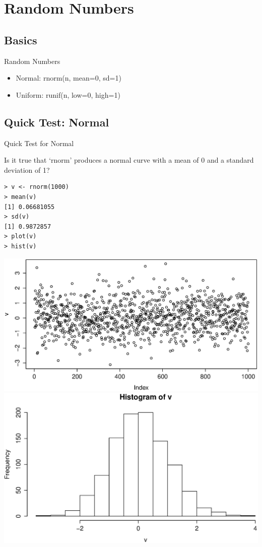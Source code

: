 \documentclass{beamer}
\begin{document}
\section{Random Numbers}

\subsection{Basics}

\begin{frame}[fragile]{Random Numbers}
    \begin{itemize}
        \item Normal: rnorm(n, mean=0, sd=1)
        \item Uniform: runif(n, low=0, high=1)
    \end{itemize}
\end{frame}

\subsection{Quick Test: Normal}
\begin{frame}[fragile]{Quick Test for Normal}

Is it true that `rnorm' produces a normal curve with a mean of 0 and a standard deviation of 1?

\begin{verbatim}
> v <- rnorm(1000)
> mean(v)
[1] 0.06681055
> sd(v)
[1] 0.9872857
> plot(v)
> hist(v)
\end{verbatim}

\includegraphics[scale=0.2]{normal_plot.eps}
\includegraphics[scale=0.2]{normal_hist.eps}

\end{frame}
\end{document}
